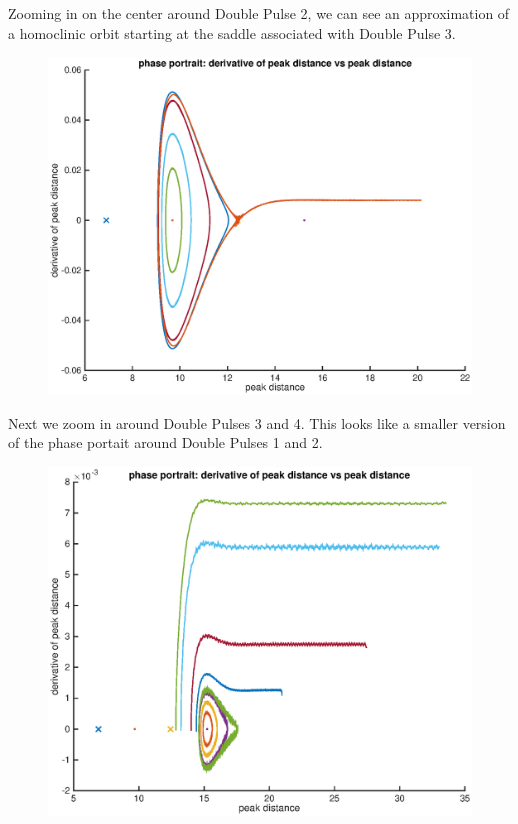 \documentclass[12pt]{article}
\begin{document}
\pagebreak

Zooming in on the center around Double Pulse 2, we can see an approximation of a homoclinic orbit starting at the saddle associated with Double Pulse 3.
\begin{figure}[H]
	\includegraphics[width=17cm]{phase2}
\end{figure}

\pagebreak

Next we zoom in around Double Pulses 3 and 4. This looks like a smaller version of the phase portait around Double Pulses 1 and 2.

\begin{figure}[H]
	\includegraphics[width=17cm]{phase3}
\end{figure}
\end{document}
